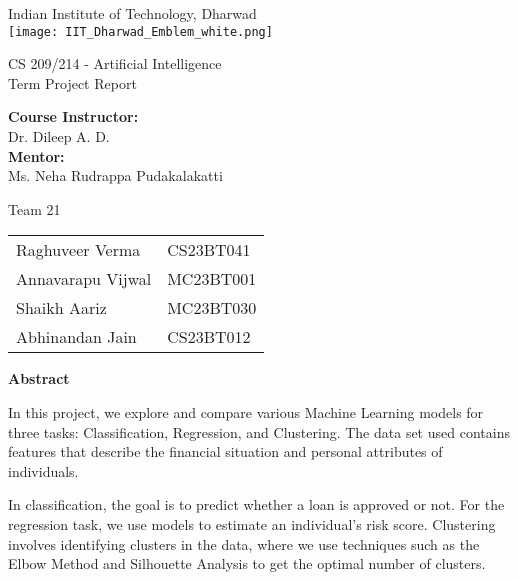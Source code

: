 \documentclass[12pt]{report}
\begin{document}
\begin{titlepage}
    \centering
    \vspace*{1cm}

    {\Huge Indian Institute of Technology, Dharwad} \\
    \vspace{1cm}
    \texttt{[image: IIT\_Dharwad\_Emblem\_white.png]} \\
    \vspace*{1cm}
    {\Huge CS 209/214 - Artificial Intelligence \\
    Term Project Report \par}
    \vspace{1.5cm}

    \Large{
    \textbf{Course Instructor:}\\
    Dr. Dileep A. D.\\
    \vspace{1cm}
    \textbf{Mentor:}\\
    Ms. Neha Rudrappa Pudakalakatti\\}
    \vfill
    {\LARGE Team 21 \par}
    \vspace{1cm}
    {\large
    \begin{tabular}{ll}
    Raghuveer Verma & \hspace{1cm} \textsf{CS23BT041} \\
    Annavarapu Vijwal & \hspace{1cm} \textsf{MC23BT001} \\
    Shaikh Aariz & \hspace{1cm} \textsf{MC23BT030} \\
    Abhinandan Jain & \hspace{1cm} \textsf{CS23BT012} \\
    \end{tabular}
    }
    
\end{titlepage}

\newpage
\begin{center}
    \textbf{Abstract}
\end{center}
In this project, we explore and compare various Machine Learning models for three tasks: Classification, Regression, and Clustering. The data set used contains features that describe the financial situation and personal attributes of individuals.

In classification, the goal is to predict whether a loan is approved or not. For the regression task, we use models to estimate an individual's risk score. Clustering involves identifying clusters in the data, where we use techniques such as the Elbow Method and Silhouette Analysis to get the optimal number of clusters.
\end{document}
